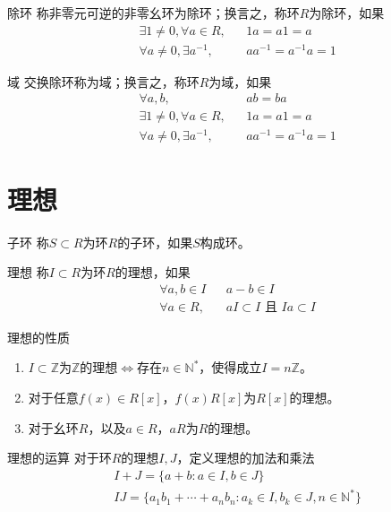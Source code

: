 \documentclass[lang = cn, scheme = chinese, thmcnt = section]{elegantbook}
\begin{document}
\begin{definition}{除环}
	称非零元可逆的非零幺环为除环；换言之，称环$R$为除环，如果
	\begin{align*}
		&\exists 1\ne 0,\forall a\in R,&&1a=a1=a\\
		& \forall a\ne0,\exists a^{-1},&& aa^{-1}=a^{-1}a=1
	\end{align*}
\end{definition}

\begin{definition}{域}
	交换除环称为域；换言之，称环$R$​为域，如果
	\begin{align*}
		&\forall a,b,&&ab=ba\\
		&\exists 1\ne 0,\forall a\in R,&&1a=a1=a\\
		& \forall a\ne0,\exists a^{-1},&& aa^{-1}=a^{-1}a=1
	\end{align*}
\end{definition}

\section{理想}

\begin{definition}{子环}
	称$S\subset R$为环$R$的子环，如果$S$构成环。
\end{definition}

\begin{definition}{理想}
	称$I\subset R$为环$R$的理想，如果
	\begin{align*}
		&\forall a,b\in I && a-b\in I\\
		&\forall a\in R,&& aI\subset I\text{ 且 }Ia\subset I
	\end{align*}
\end{definition}

\begin{proposition}{理想的性质}
	\begin{enumerate}
		\item $I\subset\mathbb{Z}$为$\mathbb{Z}$的理想$\iff$存在$n\in\mathbb{N}^*$，使得成立$I=n\mathbb{Z}$。
		\item 对于任意$f(x)\in R[x]$，$f(x)R[x]$为$R[x]$的理想。
		\item 对于幺环$R$，以及$a\in R$，$a R$为$R$的理想。
	\end{enumerate}
\end{proposition}

\begin{definition}{理想的运算}
	对于环$R$的理想$I,J$​，定义理想的加法和乘法
	\begin{align*}
		&I+J=\{ a+b:a\in I,b\in J \}\\
		&IJ=\{ a_1b_1+\cdots+a_nb_n:a_k\in I,b_k\in J,n\in\mathbb{N}^* \}
	\end{align*}
\end{definition}
\end{document}
